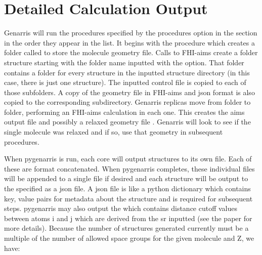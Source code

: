 \documentclass[letterpaper,10pt,english]{sphinxmanual}
\begin{document}
\section{Detailed Calculation Output}
\label{\detokenize{index:detailed-calculation-output}}\label{\detokenize{index:detailed-instructions}}
Genarris will run the procedures specified by the procedures option in the
 section in the order they appear in the list.
It begins with the  procedure which creates a folder
called  to store the
molecule geometry file. Calls to FHI-aims create a folder structure starting
with the folder name inputted with the  option.
That folder contains a folder for every structure in the inputted structure
directory (in this case, there is just one structure). The
inputted control file is copied to each of those subfolders. A copy of the
geometry file in FHI-aims and json format is also copied to the
corresponding subdirectory. Genarris replicas move from folder to folder,
performing an FHI-aims calculation in each one. This creates
the aims output file  and possibly a relaxed geometry file
. Genarris will look to see if the single molecule
was relaxed and if so, use that geometry in subsequent procedures.

When pygenarris is run, each core will output structures to its own
 file. Each of these are  format concatenated.
When pygenarris completes, these individual files will be appended to a
single  file if desired and each structure will be
output to the  specified as a json file. A json file is like a
python dictionary which contains key, value pairs for metadata
about the structure and is required for subsequent steps. pygenarris may also
output the  which contains distance cutoff
values between atoms i and j which are derived from the sr inputted
(see the paper for more details). Because the number of structures generated
currently must be a multiple of the number of allowed space groups for the
given molecule and Z, we have:

\begin{sphinxVerbatim}[commandchars=\\\{\}]
 
                 
                  
\end{sphinxVerbatim}
\end{document}
